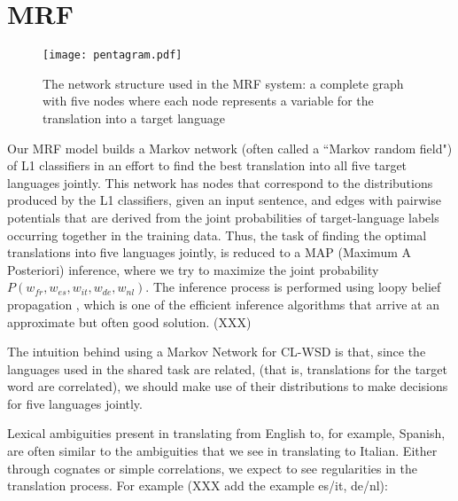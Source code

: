\documentclass[11pt,letterpaper]{article}
\begin{document}
\section{MRF}
\begin{figure}
  \begin{center}
  \texttt{[image: pentagram.pdf]}
  \end{center}
  \caption{The network structure used in the MRF system: a complete graph with five nodes %
  where each node represents a variable for the translation into a target
language}
  \label{fig:pentagram}
\end{figure}

Our MRF model builds a Markov network (often called a ``Markov random
field") of L1 classifiers in an effort to find the best translation into
all five target languages jointly. This network has nodes that correspond to
the distributions produced by the L1 classifiers, given an input
sentence, and edges with pairwise potentials that are derived from the joint
probabilities of target-language labels occurring together in the training
data. 
Thus, the task of finding the optimal translations into five languages jointly, is reduced to a MAP (Maximum A Posteriori) inference, where we try to maximize the joint probability 
$P(w_{fr},w_{es},w_{it},w_{de},w_{nl})$. The inference process is performed using loopy belief propagation \cite{DBLP:conf/uai/MurphyWJ99}, which is one of the efficient inference algorithms that arrive at an approximate but often good solution. (XXX)



The intuition behind using a Markov Network for CL-WSD is that, since the
languages used in the shared task are related, (that is, translations for the
target word are correlated), we should make use of their distributions to make
decisions for five languages jointly.

Lexical ambiguities present in translating from English to, for example,
Spanish, are often similar to the ambiguities that we see in translating to
Italian.  Either through cognates or simple correlations, we expect to see
regularities in the translation process. For example (XXX add the example
es/it, de/nl):
\end{document}
